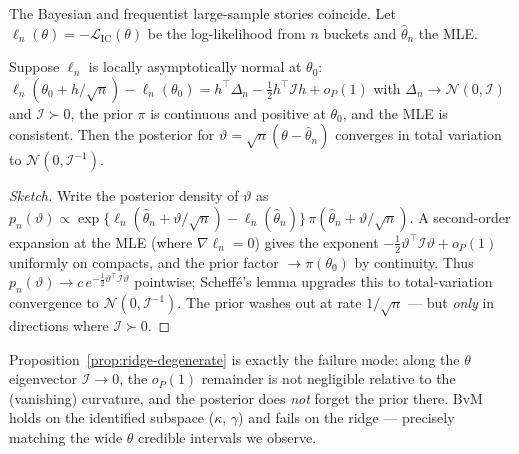 The Bayesian and frequentist large-sample stories coincide. Let
$\ell_n(\theta)=-\mathcal L_{\mathrm{IC}}(\theta)$ be the log-likelihood from $n$
buckets and $\hat\theta_n$ the MLE.

\begin{theorem}\label{thm:bvm-proof}
Suppose $\ell_n$ is locally asymptotically normal at $\theta_0$:
$\ell_n(\theta_0+h/\sqrt n)-\ell_n(\theta_0)=h^\top\Delta_n-\tfrac12 h^\top\mathcal I h+o_P(1)$
with $\Delta_n\to\mathcal N(0,\mathcal I)$ and $\mathcal I\succ0$, the prior $\pi$ is
continuous and positive at $\theta_0$, and the MLE is consistent. Then the posterior
for $\vartheta=\sqrt n(\theta-\hat\theta_n)$ converges in total variation to
$\mathcal N(0,\mathcal I^{-1})$.
\end{theorem}
\begin{proof}[Sketch]
Write the posterior density of $\vartheta$ as
$p_n(\vartheta)\propto \exp\{\ell_n(\hat\theta_n+\vartheta/\sqrt n)-\ell_n(\hat\theta_n)\}\,\pi(\hat\theta_n+\vartheta/\sqrt n)$.
A second-order expansion at the MLE (where $\nabla\ell_n=0$) gives the exponent
$-\tfrac12\vartheta^\top \mathcal I\vartheta+o_P(1)$ uniformly on compacts, and the
prior factor $\to\pi(\theta_0)$ by continuity. Thus $p_n(\vartheta)\to c\,e^{-\frac12\vartheta^\top\mathcal I\vartheta}$
pointwise; Scheff\'e's lemma upgrades this to total-variation convergence to
$\mathcal N(0,\mathcal I^{-1})$. The prior washes out at rate $1/\sqrt n$ --- but
\emph{only} in directions where $\mathcal I\succ0$.
\end{proof}

\begin{remarknote}
Proposition~\ref{prop:ridge-degenerate} is exactly the failure mode: along the
$\theta$ eigenvector $\mathcal I\to0$, the $o_P(1)$ remainder is not negligible
relative to the (vanishing) curvature, and the posterior does \emph{not} forget the
prior there. BvM holds on the identified subspace ($\kappa$, $\gamma$) and fails on
the ridge --- precisely matching the wide $\theta$ credible intervals we observe.
\end{remarknote}
